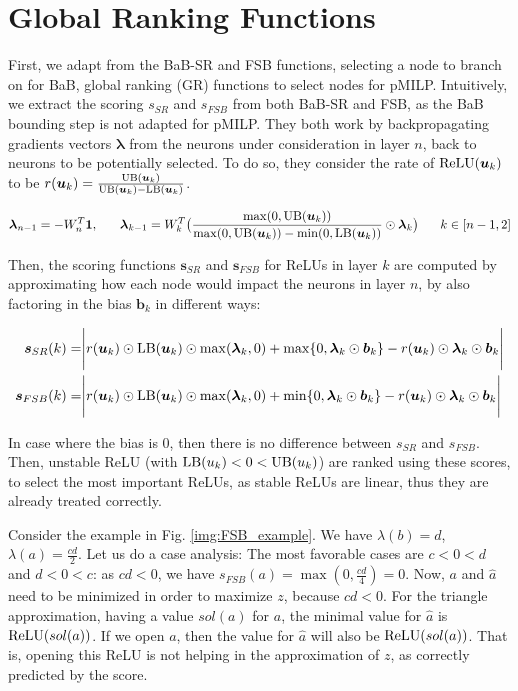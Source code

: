 \section{Global Ranking Functions}

\label{sec4p5}

First, we adapt from the BaB-SR \cite{BaB} and FSB \cite{FSB} functions, selecting a node to branch on for BaB, global ranking (GR) functions to select nodes for pMILP. Intuitively, we extract the scoring $s_{SR}$ and $s_{FSB}$ from both BaB-SR and FSB, as the BaB bounding step is not adapted for pMILP. They both work by backpropagating gradients vectors $\bm{\lambda}$ from the neurons under consideration in layer $n$, back to neurons to be potentially selected. To do so, they consider the rate of $\mathrm{ReLU}(\bm{u}_k)$ to be $r(\bm{u}_k)=\frac{\mathrm{UB}(\bm{u}_k)}{\mathrm{UB}(\bm{u}_k)-\mathrm{LB}(\bm{u}_k)}$.

\begin{align*}
\bm{\lambda}_{n-1} = -W^T_n\bm{1}, \hspace*{4ex}  	\bm{\lambda}_{k-1} = W^T_k\big(\frac{\max(0,\mathrm{UB}(\bm{u}_k))}{\max(0,\mathrm{UB}(\bm{u}_k))-\min(0,\mathrm{LB}(\bm{u}_k))}\odot\bm{\lambda}_{k}\big) \hspace*{4ex}  k\in [n-1,2]
\end{align*}


Then, the scoring functions $\bm{s}_{SR}$ and $\bm{s}_{FSB}$ for ReLUs in layer $k$ are computed by approximating how each node would impact the neurons in layer $n$, by also factoring in the bias $\bm{b}_k$ in different ways:

\begin{align*}
	\bm{s}_{SR}(k) =& %
	\Biggl\lvert r(\bm{u}_k) \odot \LB(\bm{u}_k) \odot \max(\bm{\lambda}_{k},0)
	+ \max\{0,\bm{\lambda}_{k}\odot\bm{b}_{k}\}-r(\bm{u}_k) \odot\bm{\lambda}_{k}\odot\bm{{b}}_{k}
	\Biggr\rvert  \\
	\bm{s}_{FSB}(k) =& \Biggl\lvert r(\bm{u}_k) \odot \LB(\bm{u}_k) \odot \max(\bm{\lambda}_{k},0)
	+ \min\{0,\bm{\lambda}_{k}\odot\bm{b}_{k}\}-r(\bm{u}_k) \odot\bm{\lambda}_{k}\odot\bm{{b}}_{k}
	\Biggr\rvert
\end{align*}

In case where the bias is 0, then there is no difference between $s_{SR}$ and $s_{FSB}$.
Then, unstable ReLU (with $\mathrm{LB}(u_k) < 0 < \mathrm{UB}(u_k)$) are ranked using these scores, to select the most important ReLUs, as stable ReLUs are linear, thus they are already treated correctly.


Consider the example in Fig. \ref{img:FSB_example}.
We have $\lambda(b)=d$, $\lambda(a)=\frac{cd}{2}$.
Let us do a case analysis:
The most favorable cases are $c < 0 < d$ and $d < 0 < c$: 
as $cd <0$, we have $s_{FSB}(a)=\max(0,\frac{cd}{4}) = 0$.
Now, $a$ and $\hat{a}$ need to be minimized in order to maximize $z$, because $cd <0$. 
For the triangle approximation, having a value $sol(a)$ for $a$, the minimal value for $\hat{a}$ is $\mathrm{ReLU}(sol(a))$. If we open $a$, then the value for $\hat{a}$ will also be $\mathrm{ReLU}(sol(a))$. That is, opening this ReLU is not helping in the approximation of $z$, as correctly predicted by the score.


